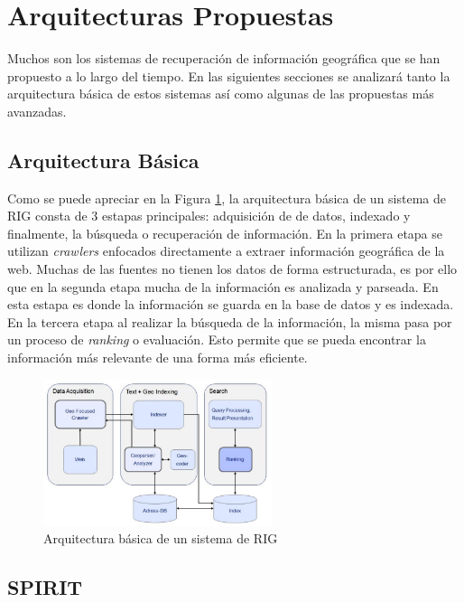 \documentclass{llncs}
\begin{document}
\section{Arquitecturas Propuestas}\label{sec:arch}

Muchos son los sistemas de recuperación de información geográfica que se han
propuesto a lo largo del tiempo. En las siguientes secciones se analizará
tanto la arquitectura básica de estos sistemas así como algunas de las
propuestas más avanzadas.

\subsection{Arquitectura Básica}\label{sec:archbas}

Como se puede apreciar en la Figura \ref{fig:archbas}, la arquitectura básica
de un sistema de RIG consta de 3 estapas principales: adquisición de de datos,
indexado y finalmente, la búsqueda o recuperación de información. En la primera
etapa se utilizan \emph{crawlers} enfocados directamente a extraer información
geográfica de la web. Muchas de las fuentes no tienen los datos de forma
estructurada, es por ello que en la segunda etapa mucha de la información es
analizada y parseada. En esta estapa es donde la información se guarda en la
base de datos y es indexada. En la tercera etapa al realizar la búsqueda de la
información, la misma pasa por un proceso de \emph{ranking} o evaluación. Esto
permite que se pueda encontrar la información más relevante de una forma más
eficiente.

\begin{figure}[htb]%
	\begin{center}
		\includegraphics[width=0.6\textwidth]{basic_arch.jpg}
	\end{center}
	\caption{Arquitectura básica de un sistema de RIG \cite{cai2011}}
	\label{fig:archbas}
\end{figure}

\subsection{SPIRIT}\label{sec:archspirit}
\end{document}
